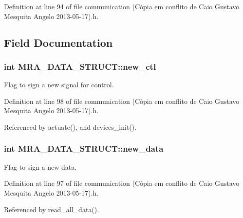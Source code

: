 Definition at line 94 of file communication (\-Cópia em conflito de Caio Gustavo Mesquita Angelo 2013-\/05-\/17).\-h.



\subsection{Field Documentation}
\hypertarget{structMRA__DATA__STRUCT_a5b1af89ee717f5b14c18e8ac12e93e75}{
\subsubsection[{new\-\_\-ctl}]{\setlength{\rightskip}{0pt plus 5cm}int M\-R\-A\-\_\-\-D\-A\-T\-A\-\_\-\-S\-T\-R\-U\-C\-T\-::new\-\_\-ctl}}\label{structMRA__DATA__STRUCT_a5b1af89ee717f5b14c18e8ac12e93e75}


Flag to sign a new signal for control. 



Definition at line 98 of file communication (\-Cópia em conflito de Caio Gustavo Mesquita Angelo 2013-\/05-\/17).\-h.



Referenced by actuate(), and devices\-\_\-init().

\hypertarget{structMRA__DATA__STRUCT_afca6e851d302f3a786885a4e1eec79d7}{
\subsubsection[{new\-\_\-data}]{\setlength{\rightskip}{0pt plus 5cm}int M\-R\-A\-\_\-\-D\-A\-T\-A\-\_\-\-S\-T\-R\-U\-C\-T\-::new\-\_\-data}}\label{structMRA__DATA__STRUCT_afca6e851d302f3a786885a4e1eec79d7}


Flag to sign a new data. 



Definition at line 97 of file communication (\-Cópia em conflito de Caio Gustavo Mesquita Angelo 2013-\/05-\/17).\-h.



Referenced by read\-\_\-all\-\_\-data().

